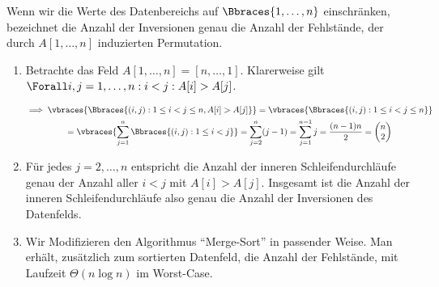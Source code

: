 \begin{solution}

Wenn wir die Werte des Datenbereichs auf $\Bbraces{1, \dots, n}$ einschränken, bezeichnet die Anzahl der Inversionen genau die Anzahl der Fehlstände, der durch $A[1, \dots, n]$ induzierten Permutation.

\begin{enumerate}[label = (\alph*)]

  \item Betrachte das Feld $A[1, \dots, n] = [n, \dots, 1]$.
  Klarerweise gilt $\Forall i, j = 1, \dots, n: i < j: A[i] > A[j]$.

  \begin{multline*}
    \implies
    \vbraces
    {
      \Bbraces
      {
        (i, j):
        1 \leq i < j \leq n,
        A[i] > A[j]
      }
    }
    =
    \vbraces
    {
      \Bbraces
      {
        (i, j):
        1 \leq i < j \leq n
      }
    } \\
    =
    \vbraces
    {
      \sum_{j=1}^n
      \Bbraces
      {
        (i, j):
        1 \leq i < j
      }
    }
    =
    \sum_{j=2}^n (j-1)
    =
    \sum_{j=1}^{n-1} j
    =
    \frac{(n - 1) n}{2}
    =
    \begin{pmatrix}
      n \\
      2
    \end{pmatrix}
  \end{multline*}

  \item Für jedes $j = 2, \dots, n$ entspricht die Anzahl der inneren Schleifendurchläufe genau der Anzahl aller $i < j$ mit $A[i] > A[j]$.
  Insgesamt ist die Anzahl der inneren Schleifendurchläufe also genau die Anzahl der Inversionen des Datenfelds.


  \item Wir Modifizieren den Algorithmus \enquote{Merge-Sort} in passender Weise.
  Man erhält, zusätzlich zum sortierten Datenfeld, die Anzahl der Fehlstände, mit Laufzeit $\Theta(n \log n)$ im Worst-Case.


\end{enumerate}
\end{solution}
